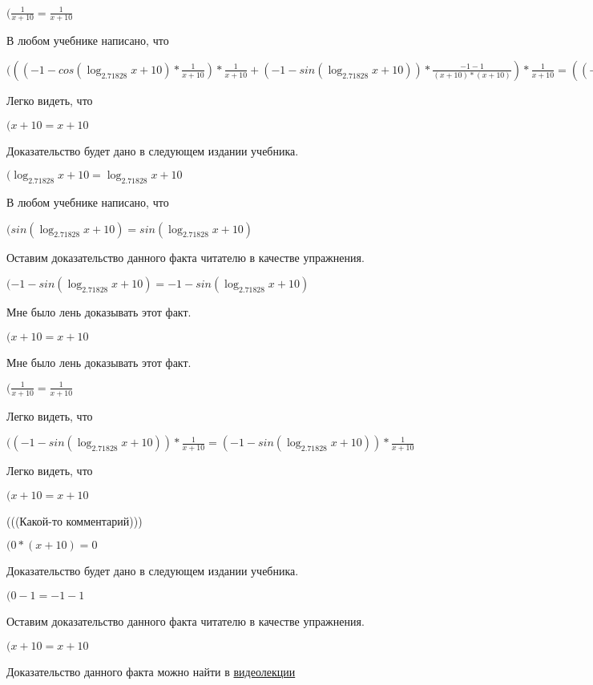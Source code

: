 \documentclass[12pt,a4paper,fleqn]{article}
\theoremstyle{definition}
\begin{document}
$(\frac{ 1 }{ x  +  10 }
 = \frac{ 1 }{ x  +  10 }
$

В любом учебнике написано, что

$((( -1  - cos(\log_{ 2.71828 }{ x  +  10 }) * \frac{ 1 }{ x  +  10 }
) * \frac{ 1 }{ x  +  10 }
 + ( -1  - sin(\log_{ 2.71828 }{ x  +  10 })) * \frac{ -1  -  1 }{( x  +  10 ) * ( x  +  10 )}
) * \frac{ 1 }{ x  +  10 }
 = (( -1  - cos(\log_{ 2.71828 }{ x  +  10 }) * \frac{ 1 }{ x  +  10 }
) * \frac{ 1 }{ x  +  10 }
 + ( -1  - sin(\log_{ 2.71828 }{ x  +  10 })) * \frac{ -1  -  1 }{( x  +  10 ) * ( x  +  10 )}
) * \frac{ 1 }{ x  +  10 }
$

Легко видеть, что

$( x  +  10  =  x  +  10 $

Доказательство будет дано в следующем издании учебника.

$(\log_{ 2.71828 }{ x  +  10 } = \log_{ 2.71828 }{ x  +  10 }$

В любом учебнике написано, что

$(sin(\log_{ 2.71828 }{ x  +  10 }) = sin(\log_{ 2.71828 }{ x  +  10 })$

Оставим доказательство данного факта читателю в качестве упражнения.

$( -1  - sin(\log_{ 2.71828 }{ x  +  10 }) =  -1  - sin(\log_{ 2.71828 }{ x  +  10 })$

Мне было лень доказывать этот факт.

$( x  +  10  =  x  +  10 $

Мне было лень доказывать этот факт.

$(\frac{ 1 }{ x  +  10 }
 = \frac{ 1 }{ x  +  10 }
$

Легко видеть, что

$(( -1  - sin(\log_{ 2.71828 }{ x  +  10 })) * \frac{ 1 }{ x  +  10 }
 = ( -1  - sin(\log_{ 2.71828 }{ x  +  10 })) * \frac{ 1 }{ x  +  10 }
$

Легко видеть, что

$( x  +  10  =  x  +  10 $

(((Какой-то комментарий)))

$( 0  * ( x  +  10 ) =  0 $

Доказательство будет дано в следующем издании учебника.

$( 0  -  1  =  -1  -  1 $

Оставим доказательство данного факта читателю в качестве упражнения.

$( x  +  10  =  x  +  10 $

Доказательство данного факта можно найти в \href{https://www.youtube.com/watch?v=dQw4w9WgXcQ}{видеолекции}
\end{document}
